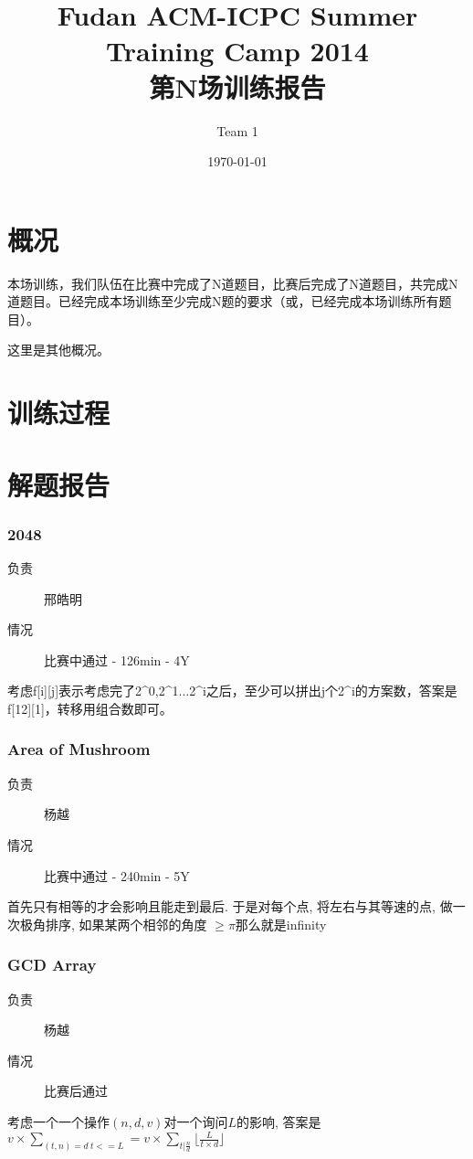 \documentclass[a4paper, 11pt, nofonts, nocap, fancyhdr]{ctexart}
\title{Fudan ACM-ICPC Summer Training Camp 2014\\第N场训练报告}
\author{Team 1}
\date{\today}
\newcommand{\problem}[1]{\subsubsection{#1}}
\begin{document}
\maketitle

\section{概况}

本场训练，我们队伍在比赛中完成了N道题目，比赛后完成了N道题目，共完成N道题目。已经完成本场训练至少完成N题的要求（或，已经完成本场训练所有题目）。

这里是其他概况。

\section{训练过程}



\section{解题报告}

\problem{2048}

\begin{description}
\item[负责] 邢皓明
\item[情况] 比赛中通过 - 126min - 4Y
\end{description}

考虑f[i][j]表示考虑完了2^0,2^1...2^i之后，至少可以拼出j个2^i的方案数，答案是f[12][1]，转移用组合数即可。

\problem{Area of Mushroom}

\begin{description}
\item[负责] 杨越
\item[情况] 比赛中通过 - 240min - 5Y
\end{description}

首先只有相等的才会影响且能走到最后. 于是对每个点, 将左右与其等速的点, 做一次极角排序, 如果某两个相邻的角度 $\geq \pi$那么就是infinity

\problem{GCD Array}

\begin{description}
\item[负责] 杨越
\item[情况] 比赛后通过
\end{description}

考虑一个一个操作$(n, d, v)$对一个询问$L$的影响, 答案是$v\times \sum\limits_{(t,n)=d\ t<=L} = v\times \sum\limits_{t|\frac{n}{d}} \lfloor\frac{L}{t\times d}\rfloor$
\end{document}
